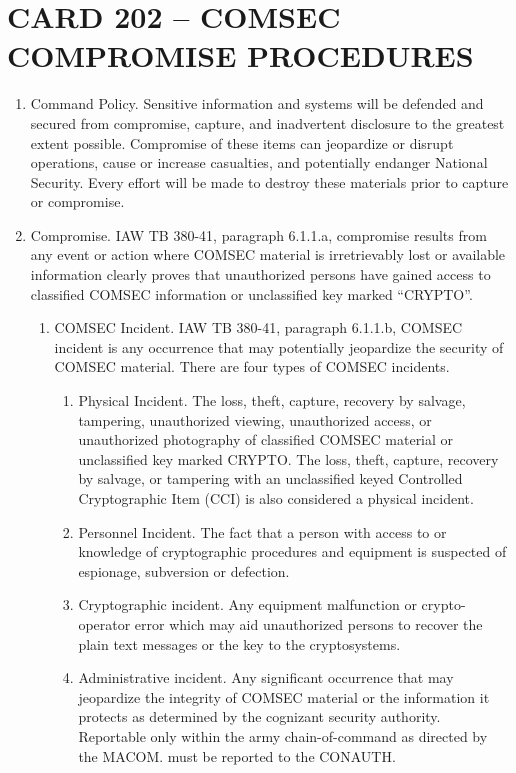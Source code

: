 \documentclass{article}
\begin{document}
\newpage
\section*{CARD 202 – COMSEC COMPROMISE PROCEDURES}
\begin{enumerate}
    \item Command Policy. Sensitive information and systems will be defended and secured from compromise, capture, and inadvertent disclosure to the greatest extent possible. Compromise of these items can jeopardize or disrupt operations, cause or increase casualties, and potentially endanger National Security. Every effort will be made to destroy these materials prior to capture or compromise. 
\item Compromise.  IAW TB 380-41, paragraph 6.1.1.a, compromise results from any event or action where COMSEC material is irretrievably lost or available information clearly proves that unauthorized persons have gained access to classified COMSEC information or unclassified key marked “CRYPTO”.
\begin{enumerate}
    \item COMSEC Incident.  IAW TB 380-41, paragraph 6.1.1.b, COMSEC incident is any occurrence that may potentially jeopardize the security of COMSEC material.  There are four types of COMSEC incidents. 
    \begin{enumerate}
        \item Physical Incident.  The loss, theft, capture, recovery by salvage, tampering, unauthorized viewing, unauthorized access, or unauthorized photography of classified COMSEC material or unclassified key marked CRYPTO.  The loss, theft, capture, recovery by salvage, or tampering with an unclassified keyed Controlled Cryptographic Item (CCI) is also considered a physical incident. 
\item Personnel Incident.  The fact that a person with access to or knowledge of cryptographic procedures and equipment is suspected of espionage, subversion or defection. 
\item Cryptographic incident.  Any equipment malfunction or crypto-operator error which may aid unauthorized persons to recover the plain text messages or the key to the cryptosystems. 
\item	Administrative incident.  Any significant occurrence that may jeopardize the integrity of COMSEC material or the information it protects as determined by the cognizant security authority.  Reportable only within the army chain-of-command as directed by the MACOM.  must be reported to the CONAUTH. 

\end{enumerate}
\end{enumerate}
\end{enumerate}
\end{document}
